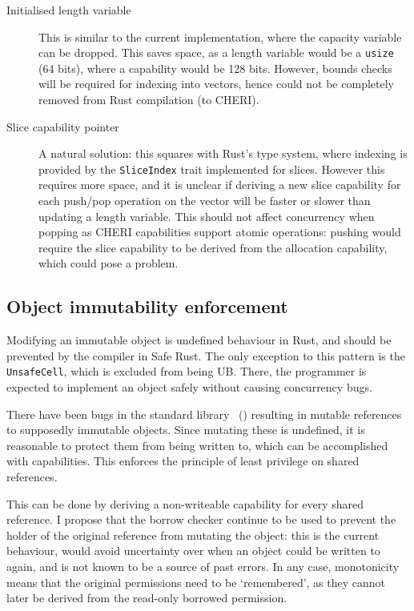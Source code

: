 \documentclass[dissertation.tex]{subfiles}
\begin{document}
\begin{description}
    \item[Initialised length variable] This is similar to the current
    implementation, where the capacity variable can be dropped.
    This saves space, as a length variable would be a \texttt{usize} (64
    bits), where a capability would be 128 bits.
    However, bounds checks will be required for indexing into vectors,
    hence could not be completely removed from Rust compilation (to
    CHERI).
    \item[Slice capability pointer] A natural solution: this squares
    with Rust's type system, where indexing is provided by the
    \texttt{SliceIndex} trait implemented for slices.
    However this requires more space, and it is unclear if deriving a
    new slice capability for each push/pop operation on the vector will
    be faster or slower than updating a length variable.
    This should not affect concurrency when popping as CHERI
    capabilities support atomic operations: pushing would require the
    slice capability to be derived from the allocation capability, which
    could pose a problem.
\end{description}


\subsection{Object immutability enforcement}
\label{sec:eval-rust-enforce-immut}

Modifying an immutable object is undefined behaviour in Rust, and should
be prevented by the compiler in Safe Rust.
The only exception to this pattern is the \texttt{UnsafeCell}, which is
excluded from being UB.
There, the programmer is expected to implement an object safely without
causing concurrency bugs.

There have been bugs in the standard library~\cite{rust-issue-vec-mut}
() resulting in mutable references to
supposedly immutable objects.
Since mutating these is undefined, it is reasonable to protect them
from being written to, which can be accomplished with capabilities.
This enforces the principle of least privilege on shared references.

This can be done by deriving a non-writeable capability for every shared
reference.
I propose that the borrow checker continue to be used to prevent the
holder of the original reference from mutating the object: this is the
current behaviour, would avoid uncertainty over when an object could be
written to again, and is not known to be a source of past errors.
In any case, monotonicity means that the original permissions need to be
`remembered', as they cannot later be derived from the read-only
borrowed permission.
\end{document}
